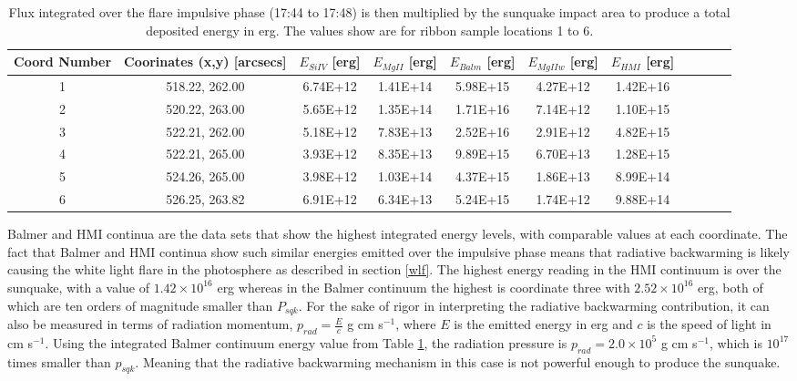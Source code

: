 \begin{table}[h]
\centering
\begin{tabular}{|c|c|c|c|c|c|c|c|c|c|c|}
Coord Number & Coorinates (x,y) [arcsecs] & $E_{Si IV}$ [erg] & $E_{Mg II}$ [erg] & $E_{Balm}$ [erg] & $E_{Mg II w}$ [erg] & $E_{HMI}$ [erg]\\
\hline
1 & 518.22, 262.00 & 6.74E+12 & 1.41E+14 & 5.98E+15 & 4.27E+12 & 1.42E+16\\
2 & 520.22, 263.00 & 5.65E+12 & 1.35E+14 & 1.71E+16 & 7.14E+12 & 1.10E+15\\
3 & 522.21, 262.00 & 5.18E+12 & 7.83E+13 & 2.52E+16 & 2.91E+12 & 4.82E+15\\
4 & 522.21, 265.00 & 3.93E+12 & 8.35E+13 & 9.89E+15 & 6.70E+13 & 1.28E+15\\
5 & 524.26, 265.00 & 3.98E+12 & 1.03E+14 & 4.37E+15 & 1.86E+13 & 8.99E+14\\
6 & 526.25, 263.82 & 6.91E+12 & 6.34E+13 & 5.24E+15 & 1.74E+12 & 9.88E+14\\
\end{tabular}
\caption{Flux integrated over the flare impulsive phase (17:44 to 17:48) is then multiplied by the sunquake impact area to produce a total deposited energy in erg. The values show are for ribbon sample locations 1 to 6.}\label{eimp}
\end{table}
\noindent
Balmer and HMI continua are the data sets that show the highest integrated energy levels, with comparable values at each coordinate. The fact that Balmer and HMI continua show such similar energies emitted over the impulsive phase means that radiative backwarming is likely causing the white light flare in the photosphere as described in section \ref{wlf}. The highest energy reading in the HMI continuum is over the sunquake, with a value of $1.42{\times}10^{16}$ erg whereas in the Balmer continuum the highest is coordinate three with $2.52{\times}10^{16}$ erg, both of which are ten orders of magnitude smaller than $P_{sqk}$. For the sake of rigor in interpreting the radiative backwarming contribution, it can also be measured in terms of radiation momentum, $p_{rad}=\frac{E}{c}$ g cm s$^{-1}$, where $E$ is the emitted energy in erg and $c$ is the speed of light in cm s$^{-1}$. Using the integrated Balmer continuum energy value from Table \ref{eimp}, the radiation pressure is $p_{rad} = 2.0{\times}10^{5}$ g cm s$^{-1}$, which is $10^{17}$ times smaller than $p_{sqk}$. Meaning that the radiative backwarming mechanism in this case is not powerful enough to produce the sunquake. \\ 

